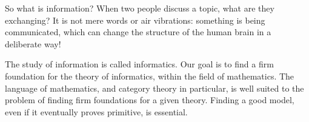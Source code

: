 \documentclass{amsart}
\begin{document}
So what is information?  When two people discuss a topic, what are they exchanging?  It is not mere words or air vibrations: something is being communicated, which can change the structure of the human 
brain in a deliberate way!  

The study of information is called informatics.  Our goal is to find a firm foundation for the theory of informatics, within the field of mathematics.  The language of mathematics, and category theory in particular, is well suited to the problem of finding firm foundations for a given theory.  Finding a good model, even if it eventually proves primitive, is essential.
\end{document}
